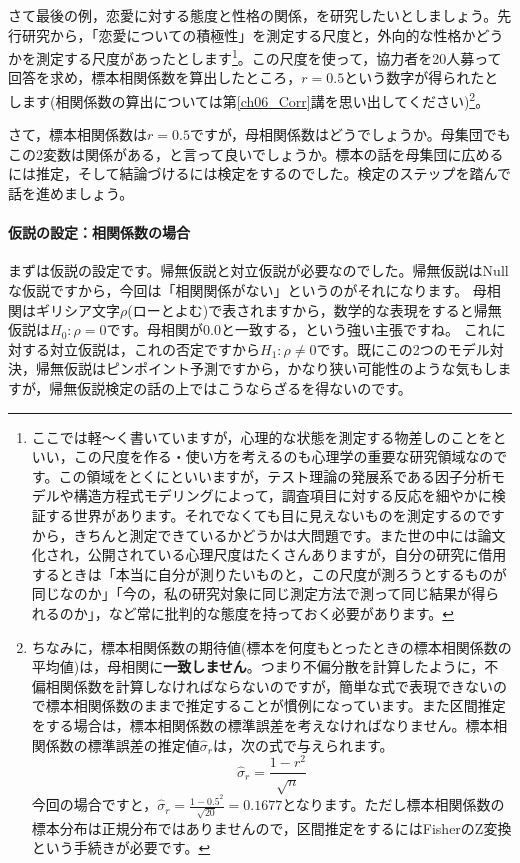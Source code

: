 \documentclass{ltjsbook}
\begin{document}
さて最後の例，恋愛に対する態度と性格の関係，を研究したいとしましょう。先行研究から，「恋愛についての積極性」を測定する尺度と，外向的な性格かどうかを測定する尺度があったとします\footnote{ここでは軽〜く書いていますが，心理的な状態を測定する物差しのことをといい，この尺度を作る・使い方を考えるのも心理学の重要な研究領域なのです。この領域をとくにといいますが，テスト理論の発展系である因子分析モデルや構造方程式モデリングによって，調査項目に対する反応を細やかに検証する世界があります。それでなくても目に見えないものを測定するのですから，きちんと測定できているかどうかは大問題です。また世の中には論文化され，公開されている心理尺度はたくさんありますが，自分の研究に借用するときは「本当に自分が測りたいものと，この尺度が測ろうとするものが同じなのか」「今の，私の研究対象に同じ測定方法で測って同じ結果が得られるのか」，など常に批判的な態度を持っておく必要があります。}。この尺度を使って，協力者を20人募って回答を求め，標本相関係数を算出したところ，$r=0.5$という数字が得られたとします(相関係数の算出については第\ref{ch06_Corr}講を思い出してください)\footnote{ちなみに，標本相関係数の期待値(標本を何度もとったときの標本相関係数の平均値)は，母相関に\textbf{一致しません}。つまり不偏分散を計算したように，不偏相関係数を計算しなければならないのですが，簡単な式で表現できないので標本相関係数のままで推定することが慣例になっています\parencite{Haebara200206,Hirakawa2021}。また区間推定をする場合は，標本相関係数の標準誤差を考えなければなりません。標本相関係数の標準誤差の推定値$\hat{\sigma}_r$は，次の式で与えられます。
	$$\hat{\sigma}_r= \frac{1-r^2}{\sqrt{n}}$$
	今回の場合ですと，$\hat{\sigma}_r = \frac{1-0.5^2}{\sqrt{20} }= 0.1677$となります。ただし標本相関係数の標本分布は正規分布ではありませんので，区間推定をするにはFisherのZ変換という手続きが必要です。}。

さて，標本相関係数は$r=0.5$ですが，母相関係数はどうでしょうか。母集団でもこの2変数は関係がある，と言って良いでしょうか。標本の話を母集団に広めるには推定，そして結論づけるには検定をするのでした。検定のステップを踏んで話を進めましょう。

\paragraph{仮説の設定：相関係数の場合}
まずは仮説の設定です。帰無仮説と対立仮説が必要なのでした。帰無仮説はNullな仮説ですから，今回は「相関関係がない」というのがそれになります。
母相関はギリシア文字$\rho$(ローとよむ)で表されますから，数学的な表現をすると帰無仮説は$H_0: \rho =0$です。母相関が$0.0$と一致する，という強い主張ですね。
これに対する対立仮説は，これの否定ですから$H_1:\rho \neq 0$です。既にこの2つのモデル対決，帰無仮説はピンポイント予測ですから，かなり狭い可能性のような気もしますが，帰無仮説検定の話の上ではこうならざるを得ないのです。
\end{document}
